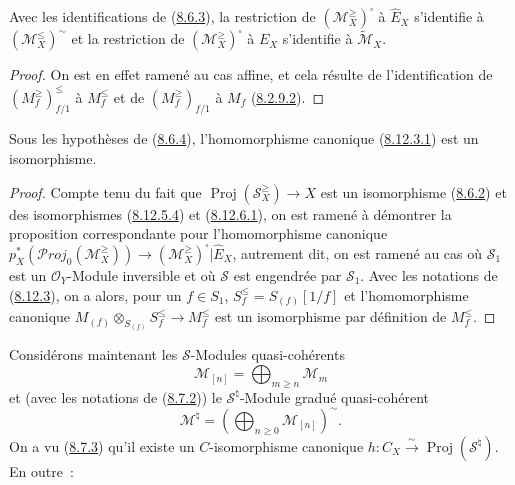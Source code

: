 \begin{corollary}[8.12.7]
\label{II.8.12.7-fr}
Avec les identifications de \textup{(\hyperref[II.8.6.3-fr]{8.6.3})}, la restriction
de $(\mathcal{M}_X^{\geq})^{\square}$ à $\widehat{E}_X$ s'identifie à
$(\mathcal{M}_X^{\leq})^{\sim}$ et la restriction de
$(\mathcal{M}_X^{\geq})^{\square}$ à $E_X$ s'identifie à
$\widetilde{\mathcal{M}}_X$.
\end{corollary}

\begin{proof}
On est en effet ramené au cas affine, et cela résulte de l'identification de
$(M_f^{\geq})_{f/1}^{\leq}$ à $M_f^{\leq}$ et de
$(M_f^{\geq})_{f/1}$ à $M_f$ (\hyperref[II.8.2.9.2-fr]{8.2.9.2}).
\end{proof}

\begin{proposition}[8.12.8]
\label{II.8.12.8-fr}
Sous les hypothèses de \textup{(\hyperref[II.8.6.4-fr]{8.6.4})}, l'homomorphisme
canonique \textup{(\hyperref[II.8.12.3.1-fr]{8.12.3.1})} est un isomorphisme.
\end{proposition}

\begin{proof}
Compte tenu du fait que $\operatorname{Proj}(\mathcal{S}_X^{\geq})\to X$
est un isomorphisme (\hyperref[II.8.6.2-fr]{8.6.2}) et des
isomorphismes (\hyperref[II.8.12.5.4-fr]{8.12.5.4}) et
(\hyperref[II.8.12.6.1-fr]{8.12.6.1}), on est ramené à démontrer la
proposition correspondante pour l'homomorphisme canonique
$p_X^*(\mathcal{P}\mathit{roj}_0(\mathcal{M}_X^{\geq}))
\to(\mathcal{M}_X^{\geq})^{\square}|\widehat{E}_X$, autrement dit, on est
ramené au cas où $\mathcal{S}_1$ est un $\mathcal{O}_Y$-Module inversible et
où $\mathcal{S}$ est engendrée par $\mathcal{S}_1$. Avec les notations de
(\hyperref[II.8.12.3-fr]{8.12.3}), on a alors, pour un $f\in S_1$,
$S_f^{\leq}=S_{(f)}[1/f]$ et l'homomorphisme canonique
$M_{(f)}\otimes_{S_{(f)}}S_f^{\leq}\to M_f^{\leq}$ est un isomorphisme par
définition de $M_f^{\leq}$.
\end{proof}

\begin{env}[8.12.9]
\label{II.8.12.9-fr}
Considérons maintenant les $\mathcal{S}$-Modules quasi-cohérents
\[
  \mathcal{M}_{[n]}=\bigoplus_{m\geqslant n}\mathcal{M}_m
\]
et (avec les notations de (\hyperref[II.8.7.2-fr]{8.7.2})) le
$\mathcal{S}^{\natural}$-Module gradué quasi-cohérent
\begin{equation}
\label{II.8.12.9.1-fr}
  \mathcal{M}^{\natural}
  =\left(\bigoplus_{n\geqslant0}\mathcal{M}_{[n]}\right)^{\sim}.
\tag{8.12.9.1}
\end{equation}
On a vu (\hyperref[II.8.7.3-fr]{8.7.3}) qu'il existe un $C$-isomorphisme
canonique $h:C_X\xrightarrow{\sim}\operatorname{Proj}(\mathcal{S}^{\natural})$.
En outre~:
\end{env}

